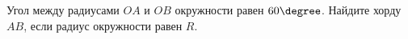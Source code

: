 \begin{ex}
	\begin{condition}
		Угол между радиусами \( OA  \) и \( OB  \) окружности равен \( 60\degree\). Найдите хорду \( AB \), если радиус окружности равен \( R \).
	\end{condition}
\end{ex}